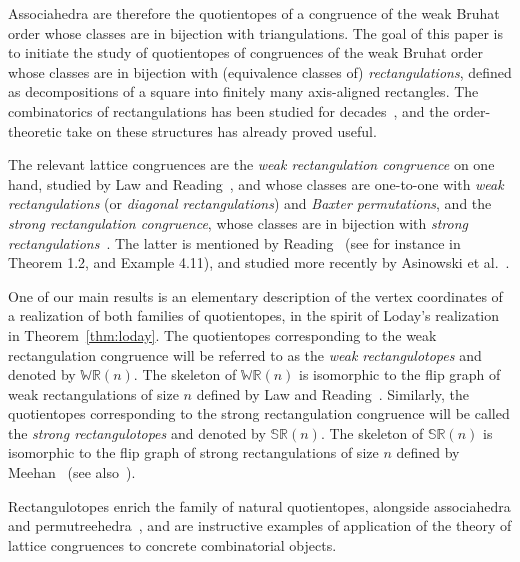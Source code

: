 \documentclass{amsart}
\theoremstyle{definition}
\newcommand{\darkblue}{\color{darkblue}} %
\newcommand{\defn}[1]{\textsl{\darkblue #1}} %
\newcommand{\polytope}[1]{\mathds{#1}} %
\newcommand{\WRP}{\polytope{WR}} %
\newcommand{\SRP}{\polytope{SR}} %
\begin{document}
Associahedra are therefore the quotientopes of a congruence of the weak Bruhat order whose classes are in bijection with triangulations.  
The goal of this paper is to initiate the study of quotientopes of congruences of the weak Bruhat order whose classes are in bijection with (equivalence classes of) \defn{rectangulations}, defined as decompositions of a square into finitely many axis-aligned rectangles. The combinatorics of rectangulations has been studied for decades~\cite{MR2233287,MR2871762,MR2864445,MR2763051,MR3084577,MR3878132,MR4598046}, and the order-theoretic take on these structures has already proved useful.

The relevant lattice congruences are the \defn{weak rectangulation congruence} on one hand, studied by Law and Reading~\cite{MR2871762}, and whose classes are one-to-one with \defn{weak rectangulations} (or \defn{diagonal rectangulations}) and \defn{Baxter permutations}, and the \defn{strong rectangulation congruence}, whose classes are in bijection with \defn{strong rectangulations}~\cite{MR2864445}. The latter is mentioned by Reading~\cite{MR3335492} (see for instance in Theorem 1.2, and Example 4.11), and studied more recently by Asinowski et al.~\cite{ACFF24}.

One of our main results is an elementary description of the vertex coordinates of a realization of both families of quotientopes, in the spirit of Loday's realization in Theorem~\ref{thm:loday}.
The quotientopes corresponding to the weak rectangulation congruence will be referred to as the \defn{weak rectangulotopes} and denoted by $\WRP(n)$.
The skeleton of $\WRP(n)$ is isomorphic to the flip graph of weak rectangulations of size $n$ defined by Law and Reading~\cite{MR2871762}.
Similarly, the quotientopes corresponding to the strong rectangulation congruence will be called the \defn{strong rectangulotopes} and denoted by $\SRP(n)$.
The skeleton of $\SRP(n)$ is isomorphic to the flip graph of strong rectangulations of size $n$ defined by Meehan~\cite{MR3697823} (see also~\cite{ACFF24}).

Rectangulotopes enrich the family of natural quotientopes, alongside associahedra and permutreehedra~\cite{MR3856522}, and are instructive examples of application of the theory of lattice congruences to concrete combinatorial objects.

\end{document}
